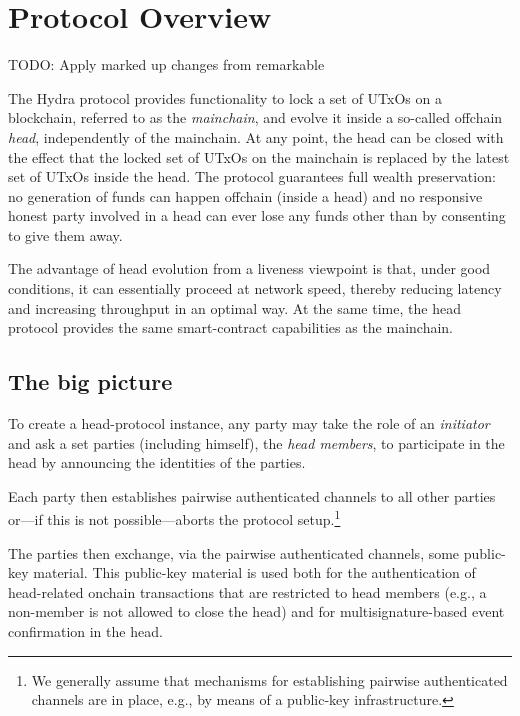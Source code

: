\section{Protocol Overview}\label{sec:overview}


TODO: Apply marked up changes from remarkable

The Hydra protocol provides functionality to lock a set of UTxOs on a
blockchain, referred to as the \emph{mainchain}, and evolve it inside a
so-called offchain \emph{head}, independently of the mainchain. At any point,
the head can be closed with the effect that the locked set of UTxOs on the
mainchain is replaced by the latest set of UTxOs inside the head. The protocol
guarantees full wealth preservation: no generation of funds can happen offchain
(inside a head) and no responsive honest party involved in a head can ever lose
any funds other than by consenting to give them away.

The advantage of head evolution from a liveness viewpoint is that, under good
conditions, it can essentially proceed at network speed, thereby reducing
latency and increasing throughput in an optimal way. At the same time, the head
protocol provides the same smart-contract capabilities as the mainchain.

\subsection{The big picture}\label{sec:overview_bp}

To create a head-protocol instance, any party may take the role of an
\emph{initiator} and ask a set parties (including himself),
the \emph{head members}, to participate in the head by announcing the
identities of the parties.

Each party then establishes pairwise authenticated channels to all other parties
or---if this is not possible---aborts the protocol setup.\footnote{We generally
  assume that mechanisms for establishing pairwise authenticated channels are in
  place, e.g., by means of a public-key infrastructure.}

The parties then exchange, via the pairwise authenticated channels,
some public-key material. This public-key material is used both
for the authentication of head-related onchain transactions that
are restricted to head members (e.g., a non-member is not allowed
to close the head) and for multisignature-based event confirmation
in the head.

